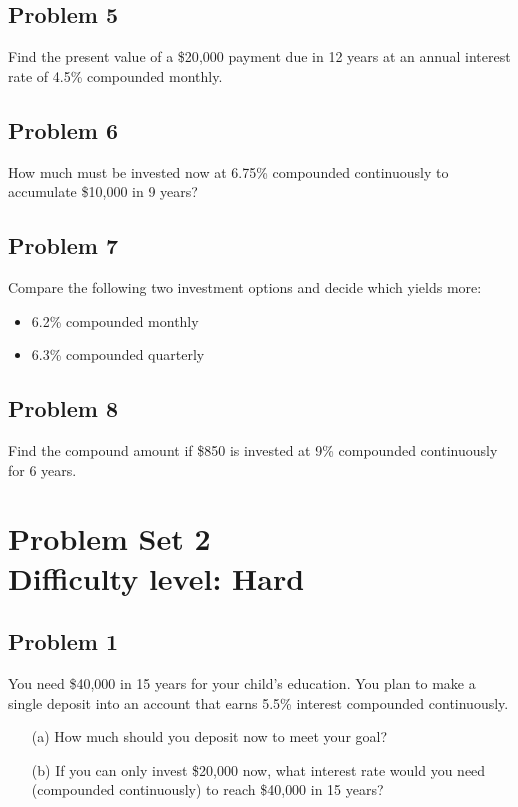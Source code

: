 \documentclass[12pt]{article}
\begin{document}
\subsection*{Problem 5}
Find the present value of a \$20{,}000 payment due in 12 years at an annual interest rate of 4.5\% compounded monthly.

\subsection*{Problem 6}
How much must be invested now at 6.75\% compounded continuously to accumulate \$10{,}000 in 9 years?

\subsection*{Problem 7}
Compare the following two investment options and decide which yields more:
\begin{itemize}
    \item 6.2\% compounded monthly
    \item 6.3\% compounded quarterly
\end{itemize}

\subsection*{Problem 8}
Find the compound amount if \$850 is invested at 9\% compounded continuously for 6 years.

\section*{Problem Set 2\\Difficulty level: Hard}
\subsection*{Problem 1}
You need \$40{,}000 in 15 years for your child’s education. You plan to make a single deposit into an account that earns 5.5\% interest compounded continuously.

\begin{itemize}
    \item[(a)] How much should you deposit now to meet your goal?
    \item[(b)] If you can only invest \$20{,}000 now, what interest rate would you need (compounded continuously) to reach \$40{,}000 in 15 years?
\end{itemize}
\end{document}
